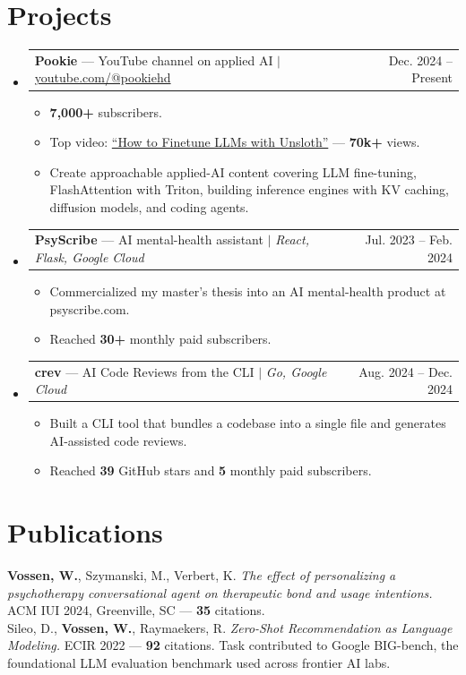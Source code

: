 \documentclass[letterpaper,11pt]{article}
\makeatletter
\newcommand{\resumeItem}[1]{
  \item\small{
    {#1 \vspace{-2pt}}
  }
}
\newcommand{\resumeProjectHeading}[2]{
    \item
    \begin{tabular*}{0.97\textwidth}{l@{\extracolsep{\fill}}r}
      \small#1 & #2 \\
    \end{tabular*}\vspace{-7pt}
}
\newcommand{\resumeSubHeadingListStart}{\begin{itemize}[leftmargin=0.15in, label={}]}
\newcommand{\resumeSubHeadingListEnd}{\end{itemize}}
\newcommand{\resumeItemListStart}{\begin{itemize}}
\newcommand{\resumeItemListEnd}{\end{itemize}\vspace{-5pt}}
\makeatother
\begin{document}
  \section{Projects}
      \resumeSubHeadingListStart
        \resumeProjectHeading
            {\textbf{Pookie} --- YouTube channel on applied AI \enspace $|$ \enspace \href{https://www.youtube.com/@pookiehd}{youtube.com/@pookiehd}}{Dec. 2024 -- Present}
            \resumeItemListStart
              \resumeItem{\textbf{7,000+} subscribers.}
              \resumeItem{Top video: \href{https://youtu.be/Lt7KrFMcCis}{``How to Finetune LLMs with Unsloth''} --- \textbf{70k+} views.}
                \resumeItem{Create approachable applied-AI content covering LLM fine-tuning, FlashAttention with Triton, building inference engines with KV caching, diffusion models, and coding agents.}
            \resumeItemListEnd
        \resumeProjectHeading
            {\textbf{PsyScribe} --- AI mental-health assistant \enspace $|$ \enspace \emph{React, Flask, Google Cloud}}{Jul. 2023 -- Feb. 2024}
            \resumeItemListStart
            \resumeItem{Commercialized my master's thesis into an AI mental-health product at psyscribe.com.}
              \resumeItem{Reached \textbf{30+} monthly paid subscribers.}
            \resumeItemListEnd
        \resumeProjectHeading
            {\textbf{crev} --- AI Code Reviews from the CLI \enspace $|$ \enspace \emph{Go, Google Cloud}}{Aug. 2024 -- Dec. 2024}
            \resumeItemListStart
              \resumeItem{Built a CLI tool that bundles a codebase into a single file and generates AI-assisted code reviews.}
              \resumeItem{Reached \textbf{39} GitHub stars and \textbf{5} monthly paid subscribers.}
            \resumeItemListEnd
      \resumeSubHeadingListEnd


  \section{Publications}
   \begin{itemize}[leftmargin=0.15in, label={}]
      \small{\item{
      \textbf{Vossen, W.}, Szymanski, M., Verbert, K. \emph{The effect of personalizing a psychotherapy conversational agent on therapeutic bond and usage intentions.} ACM IUI 2024, Greenville, SC --- \textbf{35} citations.\\
      \vspace{2pt}
      Sileo, D., \textbf{Vossen, W.}, Raymaekers, R. \emph{Zero-Shot Recommendation as Language Modeling.} ECIR 2022 --- \textbf{92} citations. Task contributed to Google BIG-bench, the foundational LLM evaluation benchmark used across frontier AI labs.
      }}
   \end{itemize}
%
\end{document}
